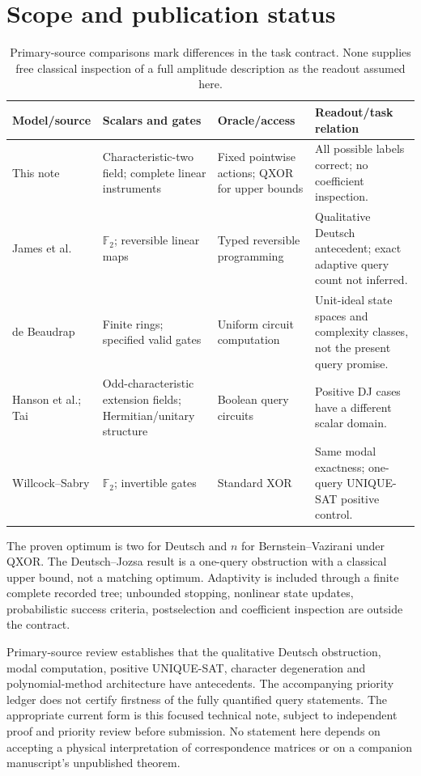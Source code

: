 \documentclass[11pt]{article}
\newcommand{\F}{\mathbb F}
\begin{document}
\section{Scope and publication status}
\begin{table}[ht]\centering\small
\begin{tabular}{L{.20\linewidth}L{.22\linewidth}L{.23\linewidth}L{.23\linewidth}}\toprule
Model/source & Scalars and gates & Oracle/access & Readout/task relation\\\midrule
This note & Characteristic-two field; complete linear instruments & Fixed pointwise actions; QXOR for upper bounds & All possible labels correct; no coefficient inspection.\\
James et al. & $\F_2$; reversible linear maps & Typed reversible programming & Qualitative Deutsch antecedent; exact adaptive query count not inferred.\\
de Beaudrap & Finite rings; specified valid gates & Uniform circuit computation & Unit-ideal state spaces and complexity classes, not the present query promise.\\
Hanson et al.; Tai & Odd-characteristic extension fields; Hermitian/unitary structure & Boolean query circuits & Positive DJ cases have a different scalar domain.\\
Willcock--Sabry & $\F_2$; invertible gates & Standard XOR & Same modal exactness; one-query UNIQUE-SAT positive control.\\\bottomrule
\end{tabular}
\caption{Primary-source comparisons mark differences in the task contract. None supplies free classical inspection of a full amplitude description as the readout assumed here.}\label{tab:prior}
\end{table}

The proven optimum is two for Deutsch and $n$ for Bernstein--Vazirani under QXOR. The Deutsch--Jozsa result is a one-query obstruction with a classical upper bound, not a matching optimum. Adaptivity is included through a finite complete recorded tree; unbounded stopping, nonlinear state updates, probabilistic success criteria, postselection and coefficient inspection are outside the contract.

Primary-source review establishes that the qualitative Deutsch obstruction, modal computation, positive UNIQUE-SAT, character degeneration and polynomial-method architecture have antecedents. The accompanying priority ledger does not certify firstness of the fully quantified query statements. The appropriate current form is this focused technical note, subject to independent proof and priority review before submission. No statement here depends on accepting a physical interpretation of correspondence matrices or on a companion manuscript's unpublished theorem.



\end{document}
